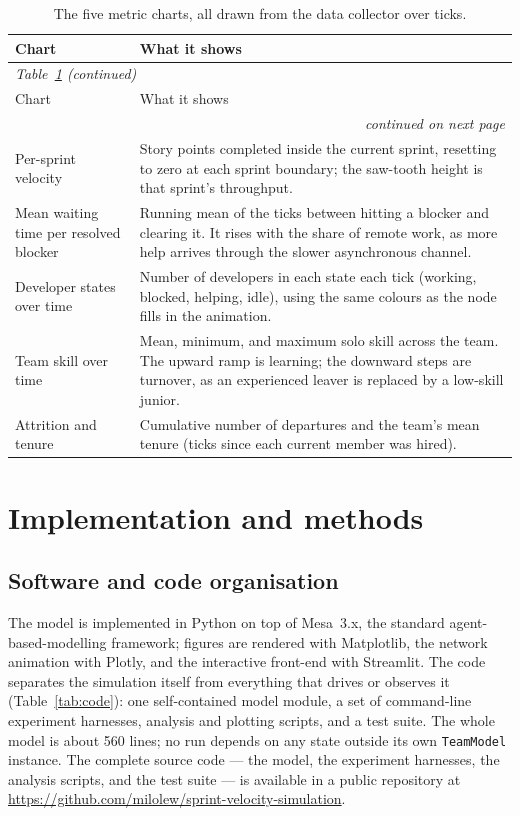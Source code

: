 \documentclass[11pt,a4paper]{article}
\begin{document}
{\footnotesize
\setlength{\tabcolsep}{5pt}
\setlength{\LTleft}{0pt plus 1fill}\setlength{\LTright}{0pt plus 1fill}
\begin{longtable}{p{4.6cm}p{10.4cm}}
\caption{The five metric charts, all drawn from the data collector over ticks.}\label{tab:ui-charts}\\
\toprule
Chart & What it shows \\
\midrule
\endfirsthead
\multicolumn{2}{l}{\itshape\small Table~\ref{tab:ui-charts} (continued)}\\[2pt]
\toprule
Chart & What it shows \\
\midrule
\endhead
\midrule
\multicolumn{2}{r}{\itshape\small continued on next page}\\
\endfoot
\bottomrule
\endlastfoot
Per-sprint velocity & Story points completed inside the current sprint, resetting to zero at each sprint boundary; the saw-tooth height is that sprint's throughput. \\
Mean waiting time per resolved blocker & Running mean of the ticks between hitting a blocker and clearing it. It rises with the share of remote work, as more help arrives through the slower asynchronous channel. \\
Developer states over time & Number of developers in each state each tick (working, blocked, helping, idle), using the same colours as the node fills in the animation. \\
Team skill over time & Mean, minimum, and maximum solo skill across the team. The upward ramp is learning; the downward steps are turnover, as an experienced leaver is replaced by a low-skill junior. \\
Attrition and tenure & Cumulative number of departures and the team's mean tenure (ticks since each current member was hired). \\
\end{longtable}
}

\section{Implementation and methods}
\label{sec:impl}

\subsection{Software and code organisation}

The model is implemented in Python on top of Mesa~3.x, the standard agent-based-modelling
framework; figures are rendered with Matplotlib, the network animation with Plotly, and the
interactive front-end with Streamlit. The code separates the simulation itself from everything
that drives or observes it (Table~\ref{tab:code}): one self-contained model module, a set of
command-line experiment harnesses, analysis and plotting scripts, and a test suite. The whole
model is about 560 lines; no run depends on any state outside its own \texttt{TeamModel} instance.
The complete source code --- the model, the experiment harnesses, the analysis scripts, and the
test suite --- is available in a public repository at
\url{https://github.com/milolew/sprint-velocity-simulation}.
\end{document}
